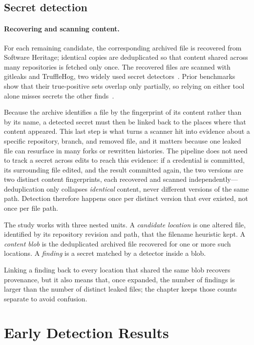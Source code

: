 \subsection{Secret detection}

\paragraph{Recovering and scanning content.}
For each remaining candidate, the corresponding archived file is recovered from Software Heritage; identical copies are deduplicated so that content shared across many repositories is fetched only once.
The recovered files are scanned with gitleaks and TruffleHog, two widely used secret detectors~\cite{DBLP:conf/msr/BasakNRW23}.
Prior benchmarks show that their true-positive sets overlap only partially, so relying on either tool alone misses secrets the other finds~\cite{DBLP:conf/esem/BasakCRW23}.

Because the archive identifies a file by the fingerprint of its content rather than by its name, a detected secret must then be linked back to the places where that content appeared.
This last step is what turns a scanner hit into evidence about a specific repository, branch, and removed file, and it matters because one leaked file can resurface in many forks or rewritten histories.
The pipeline does not need to track a secret across edits to reach this evidence: if a credential is committed, its surrounding file edited, and the result committed again, the two versions are two distinct content fingerprints, each recovered and scanned independently---deduplication only collapses \emph{identical} content, never different versions of the same path.
Detection therefore happens once per distinct version that ever existed, not once per file path.

The study works with three nested units.
A \emph{candidate location} is one altered file, identified by its repository revision and path, that the filename heuristic kept.
A \emph{content blob} is the deduplicated archived file recovered for one or more such locations.
A \emph{finding} is a secret matched by a detector inside a blob.

Linking a finding back to every location that shared the same blob recovers provenance, but it also means that, once expanded, the number of findings is larger than the number of distinct leaked files; the chapter keeps those counts separate to avoid confusion.

\section{Early Detection Results}
\label{sec:sec-bearing-files}


